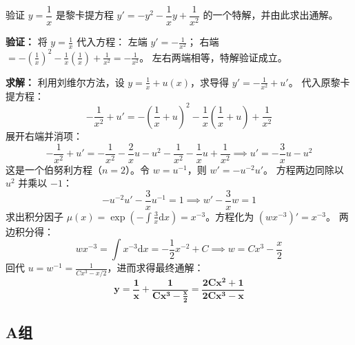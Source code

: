 \documentclass[lang=cn,11pt]{elegantbook}
\begin{document}
\begin{exercise}[黎卡提方程]
验证 $y=\dfrac{1}{x}$ 是黎卡提方程 $y'=-y^{2}-\dfrac{1}{x}y+\dfrac{1}{x^2}$ 的一个特解，并由此求出通解。
\end{exercise}
\begin{solution}
\textbf{验证：} 将 $y = \frac{1}{x}$ 代入方程：
左端 $y' = -\frac{1}{x^2}$；
右端 $=- \left(\frac{1}{x}\right)^2 - \frac{1}{x}\left(\frac{1}{x}\right) + \frac{1}{x^2} = -\frac{1}{x^2}$。
左右两端相等，特解验证成立。

\textbf{求解：} 利用刘维尔方法，设 $y = \frac{1}{x} + u(x)$，求导得 $y' = -\frac{1}{x^2} + u'$。
代入原黎卡提方程：
\[
-\frac{1}{x^2} + u' = -\left(\frac{1}{x} + u\right)^2 - \frac{1}{x}\left(\frac{1}{x} + u\right) + \frac{1}{x^2}
\]
展开右端并消项：
\[
-\frac{1}{x^2} + u' = -\frac{1}{x^2} - \frac{2}{x}u - u^2 - \frac{1}{x^2} - \frac{1}{x}u + \frac{1}{x^2} \implies u' = -\frac{3}{x}u - u^2
\]
这是一个伯努利方程（$n=2$）。令 $w = u^{-1}$，则 $w' = -u^{-2}u'$。
方程两边同除以 $u^2$ 并乘以 $-1$：
\[
-u^{-2}u' - \frac{3}{x}u^{-1} = 1 \implies w' - \frac{3}{x}w = 1
\]
求出积分因子 $\mu(x) = \exp\!\left(-\int \frac{3}{x}\mathrm{d}x\right) = x^{-3}$。方程化为 $(wx^{-3})' = x^{-3}$。
两边积分得：
\[
wx^{-3} = \int x^{-3}\mathrm{d}x = -\frac{1}{2}x^{-2} + C \implies w = Cx^3 - \frac{x}{2}
\]
回代 $u = w^{-1} = \frac{1}{Cx^3 - x/2}$，进而求得最终通解：
\[
\mathbf{y = \frac{1}{x} + \frac{1}{Cx^3 - \frac{x}{2}} = \frac{2Cx^2 + 1}{2Cx^3 - x}}
\]
\end{solution}

\subsection{A组}
\end{document}
